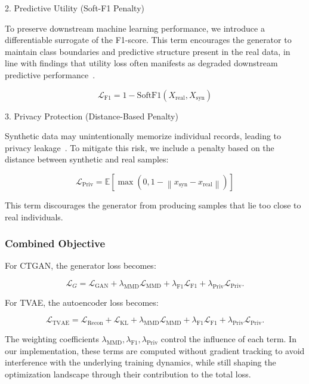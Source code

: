 \documentclass[11pt]{article}
\begin{document}
2. Predictive Utility (Soft-F1 Penalty)

To preserve downstream machine learning performance, we introduce a differentiable surrogate of the F1-score. This term encourages the generator to maintain class boundaries and predictive structure present in the real data, in line with findings that utility loss often manifests as degraded downstream predictive performance~\cite{little2025synthetic}.

\begin{equation}
\mathcal{L}_{\text{F1}} = 1 - \text{SoftF1}(X_{\text{real}}, X_{\text{syn}})
\end{equation}

3. Privacy Protection (Distance-Based Penalty)

Synthetic data may unintentionally memorize individual records, leading to privacy leakage~\cite{stadler2022synthetic}. To mitigate this risk, we include a penalty based on the distance between synthetic and real samples:

\begin{equation}
\mathcal{L}_{\text{Priv}} = \mathbb{E}\left[\max\left(0, 1 - \left\| x_{\text{syn}} - x_{\text{real}} \right\|\right)\right]
\end{equation}

This term discourages the generator from producing samples that lie too close to real individuals.

\subsubsection{Combined Objective}

For CTGAN, the generator loss becomes:

\begin{equation}
\mathcal{L}_{G} = \mathcal{L}_{\text{GAN}} 
+ \lambda_{\text{MMD}} \mathcal{L}_{\text{MMD}}
+ \lambda_{\text{F1}} \mathcal{L}_{\text{F1}}
+ \lambda_{\text{Priv}} \mathcal{L}_{\text{Priv}}.
\end{equation}

For TVAE, the autoencoder loss becomes:

\begin{equation}
\mathcal{L}_{\text{TVAE}} = 
\mathcal{L}_{\text{Recon}} + \mathcal{L}_{\text{KL}}
+ \lambda_{\text{MMD}} \mathcal{L}_{\text{MMD}}
+ \lambda_{\text{F1}} \mathcal{L}_{\text{F1}}
+ \lambda_{\text{Priv}} \mathcal{L}_{\text{Priv}}.
\end{equation}

The weighting coefficients $\lambda_{\text{MMD}}, \lambda_{\text{F1}}, \lambda_{\text{Priv}}$ control the influence of each term. In our implementation, these terms are computed without gradient tracking to avoid interference with the underlying training dynamics, while still shaping the optimization landscape through their contribution to the total loss.
\end{document}
